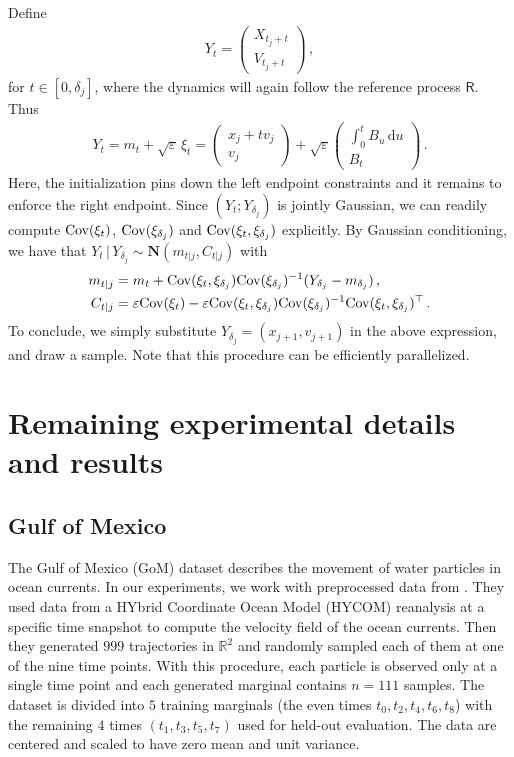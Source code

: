 \documentclass[12pt]{article}
\theoremstyle{plain}
\theoremstyle{plain}
\theoremstyle{remark}
\newcommand{\R}{\mathbb{R}}
\newcommand{\dd}{\,\mathrm{d}}
\newcommand{\msf}[1]{\mathsf{#1}}
\newcommand{\gauss}{\mathbf{N}}
\newcommand{\1}{\bm{1}}
\theoremstyle{plain}
\theoremstyle{definition}
\theoremstyle{remark}
\begin{document}
Define
\begin{align*}
     Y_t = \begin{pmatrix}
        X_{t_j + t} \\
        V_{t_j + t}
    \end{pmatrix}\,,
\end{align*}
for $t \in [0,\delta_{j}]$, where the dynamics will again follow the reference process $\msf R$. Thus
\begin{align*}
     Y_t = m_t + \sqrt \varepsilon\, \xi_t = \begin{pmatrix}
        x_j + t v_j \\
        v_j
    \end{pmatrix} + \sqrt \varepsilon \begin{pmatrix}
        \int_0^t B_u \dd u \\
        B_t
    \end{pmatrix}\,.
\end{align*}
Here, the initialization pins down the left endpoint constraints and it remains to enforce the right endpoint. Since $(Y_t; Y_{\delta_{j}})$ is jointly Gaussian, we can readily compute ${\rm Cov}(\xi_t)$, ${\rm Cov}(\xi_{\delta_j})$ and ${\rm Cov}(\xi_t,\xi_{\delta_j})$ explicitly. By Gaussian conditioning, we have that $Y_t \, | \, Y_{\delta_j} \sim {\gauss}(m_{t|j}, C_{t|j})$ with
\begin{align*}
      m_{t|j} &= m_t + {\rm Cov}(\xi_t,\xi_{\delta_j}){\rm Cov}(\xi_{\delta_j})^{-1}(Y_{\delta_j} - m_{\delta_j})\,, \\
      C_{t|j} &= \varepsilon {\rm Cov}(\xi_t) - \varepsilon {\rm Cov}(\xi_t,\xi_{\delta_j}){\rm Cov}(\xi_{\delta_j})^{-1}{\rm Cov}(\xi_t,\xi_{\delta_j})^\top\,.
\end{align*}
To conclude, we simply substitute $Y_{\delta_j} = (x_{j+1},v_{j+1})$ in the above expression, and draw a sample. Note that this procedure can be efficiently parallelized.

\section{Remaining experimental details and results}
\subsection{Gulf of Mexico}\label{app:gom}
The Gulf of Mexico (GoM) dataset describes the movement of water particles in ocean currents. In our experiments, we work with preprocessed data from \citet{shen2024multi}. They used data from a HYbrid Coordinate Ocean Model (HYCOM) reanalysis \citep{hycom2024} at a specific time snapshot to compute the velocity field of the ocean currents. Then they generated $999$ trajectories in $\R^2$ and randomly sampled each of them at one of the nine time points. With this procedure, each particle is observed only at a single time point and each generated marginal contains $n=111$ samples. The dataset is divided into $5$ training marginals (the even times $t_0, t_2, t_4, t_6, t_8$) with the remaining $4$ times $(t_1, t_3, t_5, t_7)$ used for held-out evaluation. The data are centered and scaled to have zero mean and unit variance.
\end{document}
